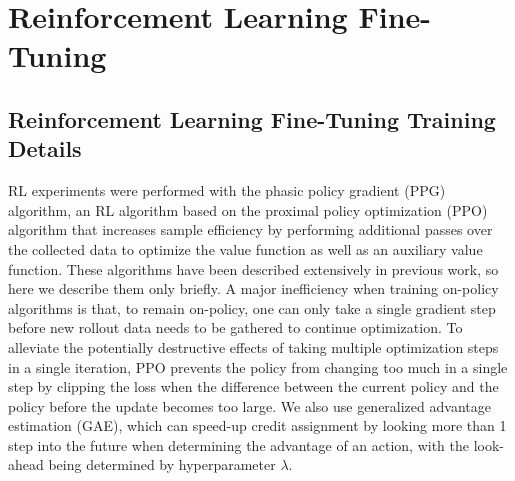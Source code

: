 \section{Reinforcement Learning Fine-Tuning}

\subsection{Reinforcement Learning Fine-Tuning Training Details}
\label{Appendix:RLTrainingDetails}

RL experiments were performed with the phasic policy gradient (PPG) algorithm,\cite{pmlr-v139-cobbe21a} an RL algorithm based on the proximal policy optimization (PPO) algorithm\cite{schulman2017proximal} that increases sample efficiency by performing additional passes over the collected data to optimize the value function as well as an auxiliary value function.
These algorithms have been described extensively in previous work,\cite{pmlr-v139-cobbe21a, schulman2017proximal} so here we describe them only briefly.
A major inefficiency when training on-policy algorithms is that, to remain on-policy, one can only take a single gradient step before new rollout data needs to be gathered to continue optimization.
To alleviate the potentially destructive effects of taking multiple optimization steps in a single iteration, PPO prevents the policy from changing too much in a single step by clipping the loss when the difference between the current policy and the policy before the update becomes too large.\cite{schulman2017proximal}
We also use generalized advantage estimation (GAE), which can speed-up credit assignment by looking more than 1 step into the future when determining the advantage of an action, with the look-ahead being determined by hyperparameter $\lambda$.\cite{schulman2015high}


